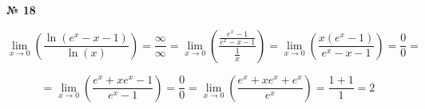 \documentclass{article}
\begin{document}
\textbf{№ 18}

$$ \lim_{x\to 0} \left( \frac{\ln(e^x-x-1)}{\ln(x)} \right) 
= \frac{\infty}{\infty} 
= \lim_{x\to 0} \left( \frac{\frac{e^x-1}{e^x-x-1}}{\frac{1}{x}} \right)
= \lim_{x\to 0} \left( \frac{x(e^x-1)}{e^x-x-1} \right) 
= \frac{0}{0} = $$

$$ = \lim_{x\to 0} \left( \frac{e^x+xe^x-1}{e^x-1} \right)
= \frac{0}{0}
= \lim_{x\to 0} \left( \frac{e^x+xe^x+e^x}{e^x} \right)
= \frac{1+1}{1}
= 2 $$
\end{document}
